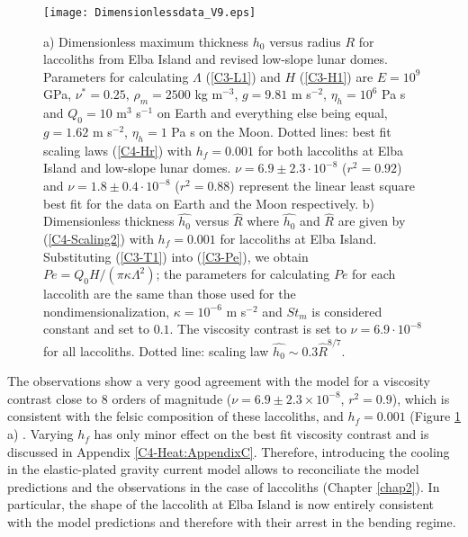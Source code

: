 \begin{figure}[h!]
  \begin{center}
    \graphicspath{ {/Users/thorey/Documents/These/Projet/Refroidissement/Skin_Model/Figure/Figure_Heating/} }
    \texttt{[image: Dimensionlessdata\_V9.eps]}
    \caption{a)  Dimensionless maximum  thickness $h_0$  versus radius
      $R$ for laccoliths from Elba  Island and revised low-slope lunar
      domes.  Parameters  for calculating $\Lambda$  (\ref{C3-L1}) and
      $H$    (\ref{C3-H1})    are    $E=10^9$    GPa,    $\nu^*=0.25$,
      $\rho_m = 2500$ kg m$^{-3}$, $g=9.81$ m s$^{-2}$, $\eta_h =10^6$
      Pa s and $Q_0 = 10$  m$^3$ s$^{-1}$ on Earth and everything else
      being equal, $g=1.62$ m s$^{-2}$, $\eta_h  =1$ Pa s on the Moon.
      Dotted  lines:   best  fit   scaling  laws   (\ref{C4-Hr})  with
      $h_f = 0.001$  for both laccoliths at Elba  Island and low-slope
      lunar domes.  $\nu = 6.9\pm  2.3 \cdot 10^{-8}$ ($r^2=0.92$) and
      $\nu  = 1.8\pm  0.4  \cdot 10^{-8}$  ($r^2=0.88$) represent  the
      linear least square best fit for  the data on Earth and the Moon
      respectively.   b)  Dimensionless thickness  $\hat{h_0}$  versus
      $\hat{R}$  where   $\hat{h_0}$  and   $\hat{R}$  are   given  by
      (\ref{C4-Scaling2})  with  $h_f=0.001$  for laccoliths  at  Elba
      Island.   Substituting  (\ref{C3-T1})   into  (\ref{C3-Pe}),  we
      obtain $Pe = Q_0 H  /(\pi \kappa \Lambda^2)$; the parameters for
      calculating $Pe$ for each laccolith are the same than those used
      for the  nondimensionalization, $\kappa=10^{-6}$ m  s$^{-2}$ and
      $St_m$ is considered  constant and set to  $0.1$.  The viscosity
      contrast is set  to $\nu =6.9\cdot 10^{-8}$  for all laccoliths.
      Dotted line: scaling law $ \hat{h_0} \sim 0.3\hat{R}^{8/7}$.}
    \label{C4-Data}
  \end{center}
\end{figure}

The  observations show  a very  good agreement  with the  model for  a
viscosity    contrast   close    to    $8$    orders   of    magnitude
($\nu =  6.9\pm 2.3 \times  10^{-8}$, $r^2=0.9$), which  is consistent
with  the  felsic composition  of  these  laccoliths, and  $h_f=0.001$
(Figure \ref{C4-Data} a) \citep{Marsh:1981dc,Diniega:2013eh}.  Varying
$h_f$ has only minor effect on  the best fit viscosity contrast and is
discussed in Appendix \ref{C4-Heat:AppendixC}.  Therefore, introducing
the  cooling in  the elastic-plated  gravity current  model allows  to
reconciliate the model predictions and the observations in the case of
laccoliths  (Chapter \ref{chap2}).   In particular,  the shape  of the
laccolith at  Elba Island  is now entirely  consistent with  the model
predictions and therefore with their arrest in the bending regime.

